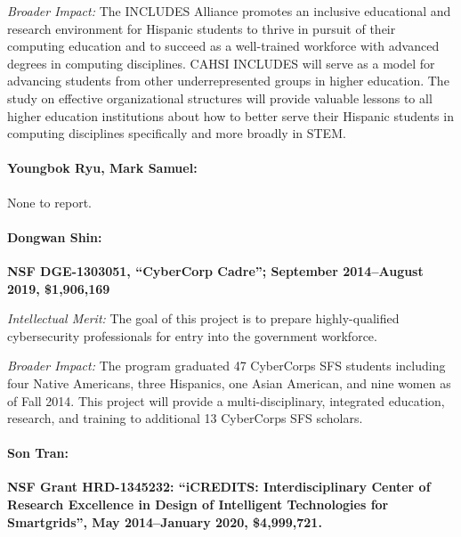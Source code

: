 \noindent \textit{Broader Impact:}
The INCLUDES Alliance promotes an inclusive educational and research environment for Hispanic students to thrive in pursuit of their computing education and to succeed as a well-trained workforce with advanced degrees in computing disciplines. 
CAHSI INCLUDES will serve as a model for advancing students from other underrepresented groups in higher education. The study on effective organizational structures will provide valuable lessons to all higher education institutions about how to better serve their Hispanic students in computing disciplines specifically and more broadly in STEM. 

\paragraph{Youngbok Ryu, Mark Samuel:} None to report.

\paragraph{Dongwan Shin:}\textbf{NSF DGE-1303051, ``CyberCorp Cadre''; September 2014--August 2019, \$1,906,169}

\noindent\textit{Intellectual Merit:} The goal of this project is to prepare highly-qualified cybersecurity professionals for entry into the government workforce. 

\noindent\textit{Broader Impact:} The program graduated 47 CyberCorps SFS students including four Native Americans, three Hispanics, one Asian American, and nine women as of Fall 2014. This project will provide a multi-disciplinary, integrated education, research, and training to additional 13 CyberCorps SFS scholars.

\paragraph{Son Tran:}
\textbf{NSF Grant HRD-1345232: ``iCREDITS: Interdisciplinary Center of Research Excellence in Design of Intelligent Technologies for Smartgrids'', May 2014--January 2020,  \$4,999,721.}

